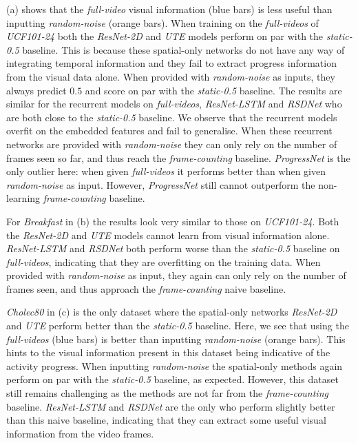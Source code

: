 (a) shows that the \textsl{full-video} visual information (blue bars) is less useful than inputting \textsl{random-noise} (orange bars).
When training on the \textsl{full-videos} of \textsl{UCF101-24} both the \textsl{ResNet-2D} and \textsl{UTE} models perform on par with the \textsl{static-0.5} baseline.
This is because these spatial-only networks do not have any way of integrating temporal information and they fail to extract progress information from the visual data alone.
When provided with \textsl{random-noise} as inputs, they always predict $0.5$ and score on par with the \textsl{static-0.5} baseline. 
The results are similar for the recurrent models on \textsl{full-videos}, \textsl{ResNet-LSTM} and \textsl{RSDNet} who are both close to the \textsl{static-0.5} baseline. 
We observe that the recurrent models overfit on the embedded features and fail to generalise. 
When these recurrent networks are provided with \textsl{random-noise} they can only rely on the number of frames seen so far, and thus reach the \textsl{frame-counting} baseline. 
\textsl{ProgressNet} is the only outlier here: when given \textsl{full-videos} it performs better than when given \textsl{random-noise} as input. 
However, \textsl{ProgressNet} still cannot outperform the non-learning \textsl{frame-counting} baseline.

For \textsl{Breakfast} in (b) the results look very similar to those on \textsl{UCF101-24}. 
Both the \textsl{ResNet-2D} and \textsl{UTE} models cannot learn from visual information alone. \textsl{ResNet-LSTM} and \textsl{RSDNet} both perform worse than the \textsl{static-0.5} baseline on \textsl{full-videos}, indicating that they are overfitting on the training data. 
When provided with \textsl{random-noise} as input, they again can only rely on the number of frames seen, and thus approach the \textsl{frame-counting} naive baseline. 

\textsl{Cholec80} in (c) is the only dataset where the spatial-only networks \textsl{ResNet-2D} and \textsl{UTE} perform better than the \textsl{static-0.5} baseline.
Here, we see that using the \textsl{full-videos} (blue bars) is better than inputting \textsl{random-noise} (orange bars).
This hints to the visual information present in this dataset being indicative of the activity progress. 
When inputting \textsl{random-noise} the spatial-only methods again perform on par with the \textsl{static-0.5} baseline, as expected. 
However, this dataset still remains challenging as the methods are not far from the \textsl{frame-counting} baseline.
\textsl{ResNet-LSTM} and \textsl{RSDNet} are the only who perform slightly better than this naive baseline, indicating that they can extract some useful visual information from the video frames. 


